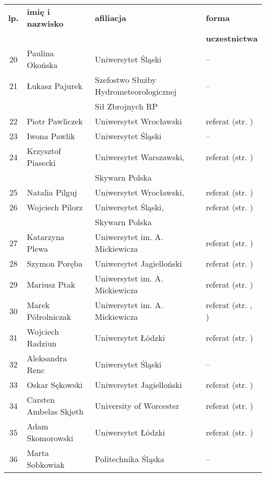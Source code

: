 \documentclass[12pt,oneside]{book}
\begin{document}
\normalsize
\begin{tabular}{||c|l|l|l||}
\hline
\hline
\textbf{lp.} & \textbf{imię i nazwisko} & \textbf{afiliacja} & \textbf{forma}\\
 &  &  & \textbf{uczestnictwa}\\
\hline
\hline
\hline
20	 & Paulina Okońska & Uniwersytet Śląski & -- \\\hline
21 	 & Łukasz Pajurek & Szefostwo Służby Hydrometeorologicznej & -- \\
	 &  & Sił Zbrojnych RP &  \\\hline
22 	 & Piotr Pawliczek & Uniwersytet Wrocławski & referat (str. \pageref{pawliczek})\\\hline
23 	 & Iwona Pawlik & Uniwersytet Śląski & -- \\\hline
24 	 & Krzysztof Piasecki & Uniwersytet Warszawski, & referat (str. \pageref{piasecki})\\
		 &  & Skywarn Polska &  \\\hline
25     & Natalia Pilguj & Uniwersytet Wrocławski, & referat (str. \pageref{pilguj})\\\hline
26	 & Wojciech Pilorz & Uniwersytet Śląski, & referat (str. \pageref{piasecki})\\
	 &  & Skywarn Polska &  \\\hline
27  	 & Katarzyna Plewa & Uniwersytet im. A. Mickiewicza & referat  (str. \pageref{plewa})\\\hline
28	 & Szymon Poręba & Uniwersytet Jagielloński & referat (str. \pageref{poreba}) \\\hline
29	 & Mariusz Ptak & Uniwersytet im. A. Mickiewicza & referat (str. \pageref{ptak}) \\\hline
30	 & Marek Półrolniczak & Uniwersytet im. A. Mickiewicza & referat (str. \pageref{kendzierski}, \pageref{kolendowicz}) \\\hline
31   & Wojciech Radziun & Uniwersytet Łódzki & referat (str. \pageref{radziun}) \\\hline
32 	 & Aleksandra Renc & Uniwersytet Śląski & -- \\\hline
33	 & Oskar Sękowski & Uniwersytet Jagielloński & referat (str. \pageref{sekowski}) \\\hline
34	 & Carsten Ambelas Skjøth & University of Worcester & referat (str. \pageref{bilinska}) \\\hline
35	 & Adam Skomorowski & Uniwersytet Łódzki & referat (str. \pageref{skomorowski}) \\\hline	
36	 & Marta Sobkowiak & Politechnika Śląska & -- \\\hline

\end{tabular}
\end{document}
